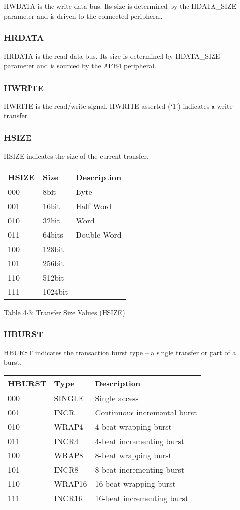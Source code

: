 HWDATA is the write data bus. Its size is determined by the HDATA\_SIZE
parameter and is driven to the connected peripheral.

\subsubsection{HRDATA}\label{hrdata}

HRDATA is the read data bus. Its size is determined by HDATA\_SIZE
parameter and is sourced by the APB4 peripheral.

\subsubsection{HWRITE}\label{hwrite}

HWRITE is the read/write signal. HWRITE asserted (`1') indicates a write
transfer.

\subsubsection{HSIZE}\label{hsize}

HSIZE indicates the size of the current transfer.

\begin{longtable}[]{@{}lll@{}}
\toprule
HSIZE & Size & Description\tabularnewline
\midrule
\endhead
000 & 8bit & Byte\tabularnewline
001 & 16bit & Half Word\tabularnewline
010 & 32bit & Word\tabularnewline
011 & 64bits & Double Word\tabularnewline
100 & 128bit &\tabularnewline
101 & 256bit &\tabularnewline
110 & 512bit &\tabularnewline
111 & 1024bit &\tabularnewline
\bottomrule
\end{longtable}

\protect\hypertarget{_Toc326677773}{}{}Table 4‑3: Transfer Size Values
(HSIZE)

\protect\hypertarget{_Toc346441263}{}{\protect\hypertarget{_Toc346209454}{}{}}

\subsubsection{HBURST}\label{hburst}

HBURST indicates the transaction burst type -- a single transfer or part
of a burst.

\begin{longtable}[]{@{}lll@{}}
\toprule
HBURST & Type & Description\tabularnewline
\midrule
\endhead
000 & SINGLE & Single access\tabularnewline
001 & INCR & Continuous incremental burst\tabularnewline
010 & WRAP4 & 4-beat wrapping burst\tabularnewline
011 & INCR4 & 4-beat incrementing burst\tabularnewline
100 & WRAP8 & 8-beat wrapping burst\tabularnewline
101 & INCR8 & 8-beat incrementing burst\tabularnewline
110 & WRAP16 & 16-beat wrapping burst\tabularnewline
111 & INCR16 & 16-beat incrementing burst\tabularnewline
\bottomrule
\end{longtable}

